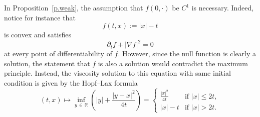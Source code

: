 \documentclass[AHL,Unicode,longabstracts,published]{cedram}
\newcommand{\R}{\mathbb{R}}
\renewcommand{\le}{\leqslant}
\newcommand{\Ll}{\left}
\newcommand{\Rr}{\right}
\newcommand{\dr}{\partial}
\begin{document}
\begin{rema}\label{r.diff.assumption}
In Proposition~\ref{p.weak}, the assumption that $f(0,\cdot)$ be $C^1$ is necessary. Indeed, notice for instance that
\begin{equation*}
f(t,x) := |x| - t
\end{equation*}
is convex and satisfies
\begin{equation*}
\dr_t f + \Ll|\nabla f\Rr|^2 = 0
\end{equation*}
at every point of differentiability of $f$. However, since the null function is clearly a solution, the statement that $f$ is also a solution would contradict the maximum principle. Instead, the viscosity solution to this equation with same initial condition is given by the Hopf--Lax formula
\begin{equation*}
(t,x) \mapsto \inf_{y\,\in\,\R} \Ll(|y| + \frac{|y-x|^2}{4t} \Rr) =
\begin{cases}
\frac{|x|^2}{4t} & \text{if } |x| \le 2t, \\
|x| - t & \text{if } |x| > 2t.
\end{cases}
\end{equation*}
\end{rema}
\end{document}
